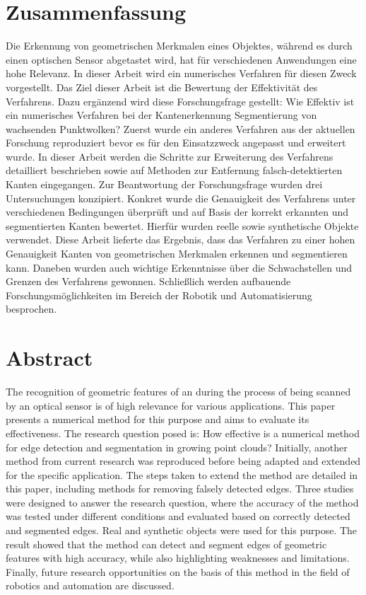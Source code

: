 \section*{\centering Zusammenfassung}
Die Erkennung von geometrischen Merkmalen eines Objektes, während es durch einen optischen Sensor abgetastet wird, hat für verschiedenen Anwendungen eine hohe Relevanz. In dieser Arbeit wird ein numerisches Verfahren für diesen Zweck vorgestellt. Das Ziel dieser Arbeit ist die Bewertung der Effektivität des Verfahrens. Dazu ergänzend wird diese Forschungsfrage gestellt: Wie Effektiv ist ein numerisches Verfahren bei der Kantenerkennung Segmentierung von wachsenden Punktwolken? Zuerst wurde ein anderes Verfahren aus der aktuellen Forschung reproduziert bevor es für den Einsatzzweck angepasst und erweitert wurde. In dieser Arbeit werden die Schritte zur Erweiterung des Verfahrens detailliert beschrieben sowie auf Methoden zur Entfernung falsch-detektierten Kanten eingegangen. Zur Beantwortung der Forschungsfrage wurden drei Untersuchungen konzipiert. Konkret wurde die Genauigkeit des Verfahrens unter verschiedenen Bedingungen überprüft und auf Basis der korrekt erkannten und segmentierten Kanten bewertet. Hierfür wurden reelle sowie synthetische Objekte verwendet. Diese Arbeit lieferte das Ergebnis, dass das Verfahren zu einer hohen Genauigkeit Kanten von geometrischen Merkmalen erkennen und segmentieren kann. Daneben wurden auch wichtige Erkenntnisse über die Schwachstellen und Grenzen des Verfahrens gewonnen. Schließlich werden aufbauende Forschungsmöglichkeiten im Bereich der Robotik und Automatisierung besprochen.

\section*{\centering Abstract}
The recognition of geometric features of an during the process of being scanned by an optical sensor is of high relevance for various applications. This paper presents a numerical method for this purpose and aims to evaluate its effectiveness. The research question posed is: How effective is a numerical method for edge detection and segmentation in growing point clouds? Initially, another method from current research was reproduced before being adapted and extended for the specific application. The steps taken to extend the method are detailed in this paper, including methods for removing falsely detected edges. Three studies were designed to answer the research question, where the accuracy of the method was tested under different conditions and evaluated based on correctly detected and segmented edges. Real and synthetic objects were used for this purpose. The result showed that the method can detect and segment edges of geometric features with high accuracy, while also highlighting weaknesses and limitations. Finally, future research opportunities on the basis of this method in the field of robotics and automation are discussed.
